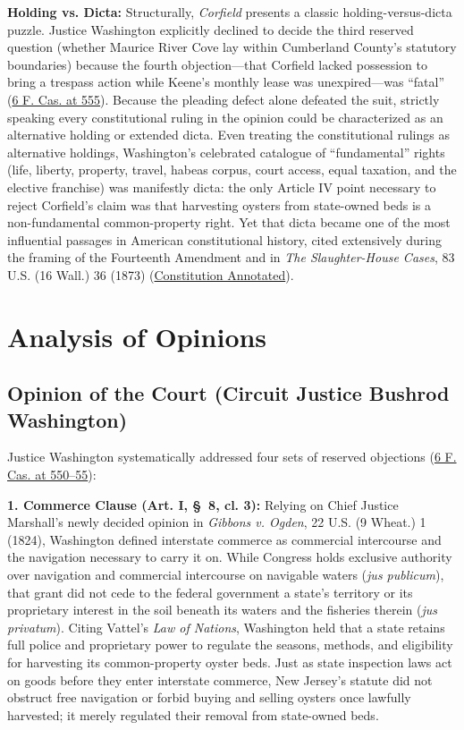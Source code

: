 \documentclass[12pt]{article}
\begin{document}
\textbf{Holding vs. Dicta:} Structurally, \textit{Corfield} presents a classic holding-versus-dicta puzzle. Justice Washington explicitly declined to decide the third reserved question (whether Maurice River Cove lay within Cumberland County's statutory boundaries) because the fourth objection---that Corfield lacked possession to bring a trespass action while Keene's monthly lease was unexpired---was ``fatal'' (\href{https://press-pubs.uchicago.edu/founders/documents/a4_2_1s18.html}{6 F. Cas. at 555}). Because the pleading defect alone defeated the suit, strictly speaking every constitutional ruling in the opinion could be characterized as an alternative holding or extended dicta. Even treating the constitutional rulings as alternative holdings, Washington's celebrated catalogue of ``fundamental'' rights (life, liberty, property, travel, habeas corpus, court access, equal taxation, and the elective franchise) was manifestly dicta: the only Article IV point necessary to reject Corfield's claim was that harvesting oysters from state-owned beds is a non-fundamental common-property right. Yet that dicta became one of the most influential passages in American constitutional history, cited extensively during the framing of the Fourteenth Amendment and in \textit{The Slaughter-House Cases}, 83 U.S. (16 Wall.) 36 (1873) (\href{https://constitution.congress.gov/browse/essay/artIV-S2-C1-7/ALDE_00013783/}{Constitution Annotated}).

\section{Analysis of Opinions}

\subsection{Opinion of the Court (Circuit Justice Bushrod Washington)}

Justice Washington systematically addressed four sets of reserved objections (\href{https://press-pubs.uchicago.edu/founders/documents/a4_2_1s18.html}{6 F. Cas. at 550--55}):

\textbf{1. Commerce Clause (Art. I, \S\ 8, cl. 3):} Relying on Chief Justice Marshall's newly decided opinion in \textit{Gibbons v. Ogden}, 22 U.S. (9 Wheat.) 1 (1824), Washington defined interstate commerce as commercial intercourse and the navigation necessary to carry it on. While Congress holds exclusive authority over navigation and commercial intercourse on navigable waters (\textit{jus publicum}), that grant did not cede to the federal government a state's territory or its proprietary interest in the soil beneath its waters and the fisheries therein (\textit{jus privatum}). Citing Vattel's \textit{Law of Nations}, Washington held that a state retains full police and proprietary power to regulate the seasons, methods, and eligibility for harvesting its common-property oyster beds. Just as state inspection laws act on goods before they enter interstate commerce, New Jersey's statute did not obstruct free navigation or forbid buying and selling oysters once lawfully harvested; it merely regulated their removal from state-owned beds.
\end{document}
